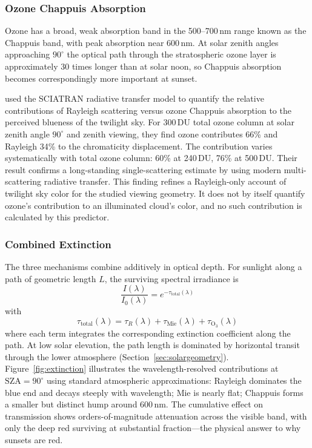 \documentclass[11pt,a4paper]{article}
\newcommand{\SZA}{\text{SZA}}
\newcommand{\tauR}{\tau_R}
\newcommand{\tauM}{\tau_{\text{Mie}}}
\newcommand{\tauO}{\tau_{\mathrm{O_3}}}
\newcommand{\tautotal}{\tau_{\text{total}}}
\begin{document}
\subsubsection{Ozone Chappuis Absorption}

Ozone has a broad, weak absorption band in the 500--700\,nm range known as the Chappuis band, with peak absorption near 600\,nm. At solar zenith angles approaching $90^\circ$ the optical path through the stratospheric ozone layer is approximately 30 times longer than at solar noon, so Chappuis absorption becomes correspondingly more important at sunset.

\citet{lange2023revisiting} used the SCIATRAN radiative transfer model to quantify the relative contributions of Rayleigh scattering versus ozone Chappuis absorption to the perceived blueness of the twilight sky. For 300\,DU total ozone column at solar zenith angle $90^\circ$ and zenith viewing, they find ozone contributes 66\% and Rayleigh 34\% to the chromaticity displacement. The contribution varies systematically with total ozone column: 60\% at 240\,DU, 76\% at 500\,DU. Their result confirms a long-standing single-scattering estimate by \citet{hulburt1953explanation} using modern multi-scattering radiative transfer. This finding refines a Rayleigh-only account of twilight sky color for the studied viewing geometry. It does not by itself quantify ozone's contribution to an illuminated cloud's color, and no such contribution is calculated by this predictor.

\subsubsection{Combined Extinction}

The three mechanisms combine additively in optical depth. For sunlight along a path of geometric length $L$, the surviving spectral irradiance is
\begin{equation}
\frac{I(\lambda)}{I_0(\lambda)} = e^{-\tautotal(\lambda)}
\label{eq:beer}
\end{equation}
with
\begin{equation}
\tautotal(\lambda) = \tauR(\lambda) + \tauM(\lambda) + \tauO(\lambda)
\label{eq:tausum}
\end{equation}
where each term integrates the corresponding extinction coefficient along the path. At low solar elevation, the path length is dominated by horizontal transit through the lower atmosphere (Section~\ref{sec:solargeometry}). Figure~\ref{fig:extinction} illustrates the wavelength-resolved contributions at $\SZA = 90^\circ$ using standard atmospheric approximations: Rayleigh dominates the blue end and decays steeply with wavelength; Mie is nearly flat; Chappuis forms a smaller but distinct hump around 600\,nm. The cumulative effect on transmission shows orders-of-magnitude attenuation across the visible band, with only the deep red surviving at substantial fraction---the physical answer to why sunsets are red.
\end{document}
